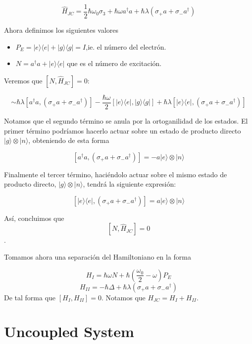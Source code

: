 \documentclass[spanish]{article}
\begin{document}
\begin{equation}
\hat{H}_{JC} = \frac{1}{2}\hbar \omega_0\sigma_3 + \hbar \omega a^\dagger a + \hbar\lambda(\sigma_+a + \sigma_-a^\dagger)
\end{equation}

Ahora definimos los siguientes valores 

\begin{itemize}
\item $P_E=|e\rangle \langle e| + |g\rangle \langle g| = I$,ie. el número del electrón.
\item $N = a^\dagger a + |e\rangle \langle e|$ que es el número de excitación.
\end{itemize}

Veremos que $[N,\hat{H}_{JC}] = 0$:

\begin{equation}
[N,\hat{H}_{JC}] \sim \hbar \lambda[a^\dagger a, (\sigma_+a + \sigma_-a^\dagger)]-\frac{\hbar \omega}{2}[|e\rangle\langle e |, |g\rangle \langle g|]+\hbar \lambda[|e\rangle\langle e |,(\sigma_+a + \sigma_-a^\dagger)]
\end{equation}

Notamos que el segundo término se anula por la ortoganilidad de los estados. El primer término podríamos hacerlo actuar sobre un estado de producto directo $|g\rangle \otimes |n\rangle$, obteniendo de esta forma 

$$[a^\dagger a, (\sigma_+a + \sigma_-a^\dagger)] = -a|e\rangle \otimes |n\rangle $$

Finalmente el tercer término, haciéndolo actuar sobre el mismo estado de producto directo, $|g\rangle \otimes |n\rangle$, tendrá la siguiente expresión: 

$$[|e\rangle\langle e |,(\sigma_+a + \sigma_-a^\dagger)]= a|e\rangle \otimes |n\rangle $$

Así, concluimos que $$[N,\hat{H}_{JC}] = 0$$.

Tomamos ahora una separación del Hamiltoniano en la forma 

$$ H_I=\hbar \omega N + \hbar(\frac{\omega_0}{2}-\omega)P_E $$
$$ H_{II}=-\hbar\Delta + \hbar\lambda(\sigma_+a + \sigma_-a^\dagger)$$
De tal forma que $[H_I,H_{II}]=0$. Notamos que $H_{JC} = H_I+H_{II}$. 





\section{Uncoupled System}
\end{document}
